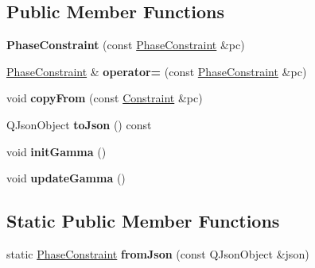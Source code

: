 \subsection*{Public Member Functions}
\begin{DoxyCompactItemize}
\item 
\hypertarget{class_phase_constraint_a0427c3b6a50820aee9dfa4f827dcfc22}{{\bfseries Phase\-Constraint} (const \hyperlink{class_phase_constraint}{Phase\-Constraint} \&pc)}\label{class_phase_constraint_a0427c3b6a50820aee9dfa4f827dcfc22}

\item 
\hypertarget{class_phase_constraint_ac6253d5a70ab537e22781244663e9f4a}{\hyperlink{class_phase_constraint}{Phase\-Constraint} \& {\bfseries operator=} (const \hyperlink{class_phase_constraint}{Phase\-Constraint} \&pc)}\label{class_phase_constraint_ac6253d5a70ab537e22781244663e9f4a}

\item 
\hypertarget{class_phase_constraint_a1aff9d1493b07318f498f7be2a4a191f}{void {\bfseries copy\-From} (const \hyperlink{class_constraint}{Constraint} \&pc)}\label{class_phase_constraint_a1aff9d1493b07318f498f7be2a4a191f}

\item 
\hypertarget{class_phase_constraint_a68ed6b0fe4ba15f199ba7986144e4554}{Q\-Json\-Object {\bfseries to\-Json} () const }\label{class_phase_constraint_a68ed6b0fe4ba15f199ba7986144e4554}

\item 
\hypertarget{class_phase_constraint_a4ce7efc8c82898495c39874bdf08d022}{void {\bfseries init\-Gamma} ()}\label{class_phase_constraint_a4ce7efc8c82898495c39874bdf08d022}

\item 
\hypertarget{class_phase_constraint_a1cde553a288f5dbfe8ed782254d59b6f}{void {\bfseries update\-Gamma} ()}\label{class_phase_constraint_a1cde553a288f5dbfe8ed782254d59b6f}

\end{DoxyCompactItemize}
\subsection*{Static Public Member Functions}
\begin{DoxyCompactItemize}
\item 
\hypertarget{class_phase_constraint_a4719c0b5646daa8af17b339515178336}{static \hyperlink{class_phase_constraint}{Phase\-Constraint} {\bfseries from\-Json} (const Q\-Json\-Object \&json)}\label{class_phase_constraint_a4719c0b5646daa8af17b339515178336}

\end{DoxyCompactItemize}
